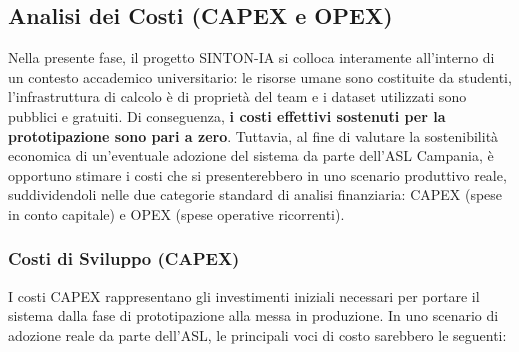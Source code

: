 \clearpage
\subsection{Analisi dei Costi (CAPEX e OPEX)}
\label{subsec:analisi_costi}

Nella presente fase, il progetto SINTON-IA si colloca interamente all'interno di un contesto accademico universitario: le risorse umane sono costituite da studenti, l'infrastruttura di calcolo è di proprietà del team e i dataset utilizzati sono pubblici e gratuiti. Di conseguenza, \textbf{i costi effettivi sostenuti per la prototipazione sono pari a zero}. Tuttavia, al fine di valutare la sostenibilità economica di un'eventuale adozione del sistema da parte dell'ASL Campania, è opportuno stimare i costi che si presenterebbero in uno scenario produttivo reale, suddividendoli nelle due categorie standard di analisi finanziaria: CAPEX (spese in conto capitale) e OPEX (spese operative ricorrenti).

\subsubsection{Costi di Sviluppo (CAPEX)}
\label{subsubsec:capex}

I costi CAPEX rappresentano gli investimenti iniziali necessari per portare il sistema dalla fase di prototipazione alla messa in produzione. In uno scenario di adozione reale da parte dell'ASL, le principali voci di costo sarebbero le seguenti:


